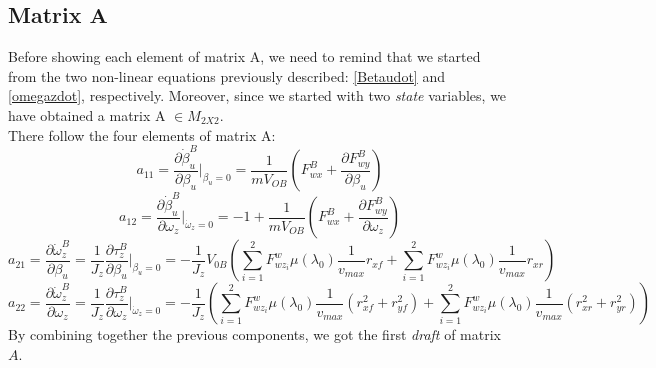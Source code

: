 \subsection{Matrix $\mathbf{A}$}
	Before showing each element of matrix A, we  need to remind that we started from the two non-linear equations previously described: \ref{Betaudot} and \ref{omegazdot}, respectively. Moreover, since we started with two \textit{state} variables, we have obtained a matrix A $\in M_{2X2}$.\\ There follow the four elements of matrix A:
		\begin{equation} \label{a11}
			a_{11} = \frac{\partial\dot{\beta}_{u}^{B}}{\partial\beta_{u}}\vert_{\beta_{u}=0}  = \frac{1}{mV_{OB}}(F_{wx}^{B} + \frac{\partial F_{wy}^{B}}{\partial\beta_{u}})
		\end{equation} 
		\begin{equation} \label{a12}
			a_{12} = \frac{\partial\dot{\beta}_{u}^{B}}{\partial\omega_{z}}\vert_{\dot\omega_{z}=0} = -1 + \frac{1}{mV_{OB}} (F_{wx}^{B} + \frac{\partial F_{wy}^{B}}{\partial\omega_{z}})
		\end{equation} 
		\begin{equation} \label{a21}
			a_{21} = \frac{\partial\dot{\omega}_{z}^{B}}{\partial\beta_{u}} = \frac{1}{J_{z}} \frac{\partial\tau_{z}^{B}}{\partial\beta_{u}} \vert_{\beta_{u}=0} = -\frac{1}{J_{z}} V_{0B} (\sum\limits_{i=1}^2 F_{wz_{i}}^{w} \mu(\lambda_{0}) \frac{1}{v_{max}}r_{xf} + \sum\limits_{i=1}^2 F_{wz_{i}}^{w} \mu(\lambda_{0}) \frac{1}{v_{max}}r_{xr})
		\end{equation}
		\begin{equation} \label{a22}
			a_{22} = \frac{\partial\dot{\omega}_{z}^{B}}{\partial\omega_{z}} = \frac{1}{J_{z}} \frac{\partial\tau_{z}^{B}}{\partial\omega_{z}}\vert_{\dot\omega_{z}=0} = -\frac{1}{J_{z}}(\sum\limits_{i=1}^2 F_{wz_{i}}^{w} \mu(\lambda_{0}) \frac{1}{v_{max}} (r_{xf}^{2} + r_{yf}^{2}) + \sum\limits_{i=1}^2 F_{wz_{i}}^{w} \mu(\lambda_{0}) \frac{1}{v_{max}} (r_{xr}^{2} + r_{yr}^{2}))
		\end{equation}
	By combining together the previous components, we got the first  \textit{draft} of matrix $A$.
